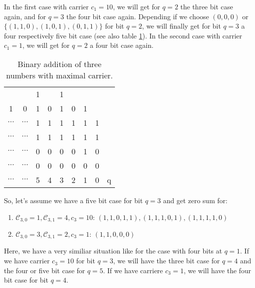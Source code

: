 \documentclass{article}
\newtheorem*{theorem A}{Theorem A}
\newtheorem*{theorem B}{N\"olker's Theorem}
\theoremstyle{remark}
\theoremstyle{remark}
\begin{document}
In the first case with carrier $c_{1} = 10$, we will get for $q = 2$ the three bit case again, and for $q = 3$ the four bit case again. Depending if we choose $\left(0,0,0\right)$ or $\{ \left(1,1,0\right), \left(1,0,1\right), \left(0,1,1\right) \}$ for bit $q = 2$, we will finally get for bit $q = 3$ a four respectively five bit case (see also table \ref{tab:binaddthreemaxcarrier}). In the second case with carrier $c_{1} = 1$, we will get for $q = 2$ a four bit case again.

\begin{table}[htp]
\caption{Binary addition of three numbers with maximal carrier.}
\label{tab:binaddthreemaxcarrier}
\centering
\vspace{0.3cm}
    \begin{tabular}{ccccccccc}
         &  & 1 &  & 1 &  &  & & \\
        1 & 0 & 1 & 0 & 1 & 0 & 1 & & \\
        \hline
        $\cdots$ & $\cdots$ & 1 & 1 & 1 & 1 & 1 & 1 & \\
        $\cdots$ & $\cdots$ & 1 & 1 & 1 & 1 & 1 & 1 & \\
        $\cdots$ & $\cdots$ & 0 & 0 & 0 & 0 & 1 & 0 & \\
        \hline
        $\cdots$ & $\cdots$ & 0 & 0 & 0 & 0 & 0 & 0 & \\
        $\cdots$ & $\cdots$ & \footnotesize{5} & \footnotesize{4} & \footnotesize{3} & \footnotesize{2} & \footnotesize{1} & \footnotesize{0} & \footnotesize{q}\\
    \end{tabular}
\end{table}

So, let's assume we have a five bit case for bit $q = 3$ and get zero sum for:

\begin{enumerate}
    \item $\mathcal{C}_{3,0} = 1, \mathcal{C}_{3,1} = 4, c_{3} = 10$: $\left(1,1,0,1,1\right), \left(1,1,1,0,1\right), \left(1,1,1,1,0\right)$
    \item $\mathcal{C}_{3,0} = 3, \mathcal{C}_{3,1} = 2, c_{3} = 1$: $\left(1,1,0,0,0\right)$
\label{enum:zerosum3thbit}
\end{enumerate}

Here, we have a very similiar situation like for the case with four bits at $q = 1$. If we have carrier $c_{3} = 10$ for bit $q = 3$, we will have the three bit case for $q = 4$ and the four or five bit case for $q = 5$. If we have carriere $c_{3} = 1$, we will have the four bit case for bit $q = 4$.\\
\end{document}
